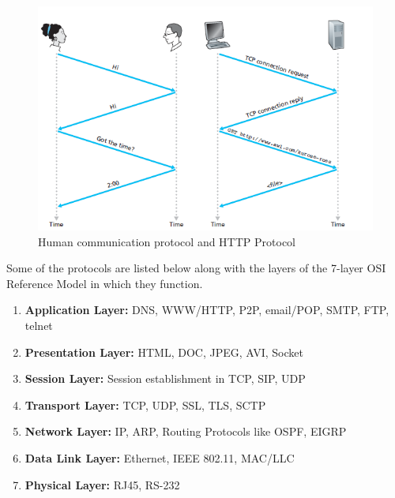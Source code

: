 \documentclass{article}
\theoremstyle{plain}
\theoremstyle{definition}
\begin{document}
\begin{figure}[h]
    \centering
    \includegraphics{cn3.png}
    \caption{Human communication protocol and HTTP Protocol}
    \label{fig:my_label_2}
\end{figure}
Some of the protocols are listed below along with the layers of the 7-layer OSI Reference Model in which they function.

\begin{enumerate}
    \item \textbf{Application Layer:} DNS, WWW/HTTP, P2P, email/POP, SMTP, FTP, telnet
    
    \item \textbf{Presentation Layer:} HTML, DOC, JPEG, AVI, Socket
    
    \item \textbf{Session Layer:} Session establishment in TCP, SIP, UDP
    
    \item \textbf{Transport Layer:} TCP, UDP, SSL, TLS, SCTP
    
    \item \textbf{Network Layer:} IP, ARP, Routing Protocols like OSPF, EIGRP
    
    \item \textbf{Data Link Layer:} Ethernet, IEEE 802.11, MAC/LLC
    
    \item \textbf{Physical Layer:} RJ45, RS-232
\end{enumerate}
\end{document}
